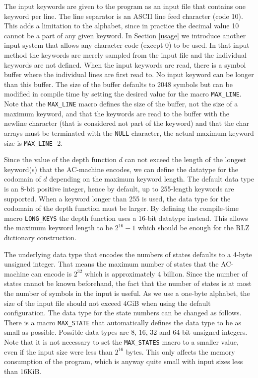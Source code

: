 \documentclass[english,twoside,censored,csm,algorithms-track-2020]{HYthesisML}
\theoremstyle{plain}
\theoremstyle{definition}
\begin{document}
The input keywords are given to the program as an input file that contains one keyword per line. The
line separator is an ASCII line feed character (code 10). This adds a limitation to the
alphabet, since in practice the decimal value 10 cannot be a part of any given keyword. In Section
\ref{usage} we introduce another input system that allows any character code (except 0) to be used. In
that input method the keywords are merely sampled from the input file and the individual keywords
are not defined. When the input keywords are read, there is a symbol buffer where the individual lines
are first read to. No input keyword can be longer than this buffer. The size of the buffer defaults
to 2048 symbols but can be modified in compile time by setting the desired value for the macro
\texttt{MAX\_LINE}.
Note that the \texttt{MAX\_LINE} macro defines the size of the buffer, not the size of a maximum
keyword, and
that the keywords are read to the buffer with the newline character (that is considered not part of the keyword)
and that the char arrays must be terminated with the \texttt{NULL} character, the actual maximum
keyword size is \texttt{MAX\_LINE} -2.

Since the value of the depth function $d$ can not exceed the length of the longest keyword(s) that the
AC-machine encodes, we can define the datatype for the codomain of $d$ depending on the maximum
keyword length. The default data type is an 8-bit positive integer, hence by default,
up to 255-length keywords are supported.
When a keyword longer than 255 is used, the data type for the codomain of the depth function
must be larger. By defining the compile-time macro \texttt{LONG\_KEYS} the depth function
uses a 16-bit datatype instead. This allows the maximum keyword length to be $2^{16}-1$ which
should be enough for the RLZ dictionary construction.

The underlying data type that encodes the numbers of states defaults to a 4-byte unsigned integer. That
means the maximum number of states that the AC-machine can encode is $2^{32}$ which is approximately
4 billion. Since the number of states cannot be known beforehand, the fact that the number of states
is at most the number of symbols in the input is useful. As we use a one-byte alphabet, the size
of the input file should not exceed 4GiB when using the default configuration. The data type
for the state numbers can be changed as follows. There is a macro \texttt{MAX\_STATE} that automatically
defines the data type to be as small as possible. Possible data types are 8, 16, 32 and 64-bit
unsigned integers. Note that it is not necessary to set the \texttt{MAX\_STATES} macro to a smaller value,
even if the input size were less than $2^{16}$ bytes. This only affects the memory consumption of
the program, which is anyway quite small with input sizes less than 16KiB.
\end{document}
